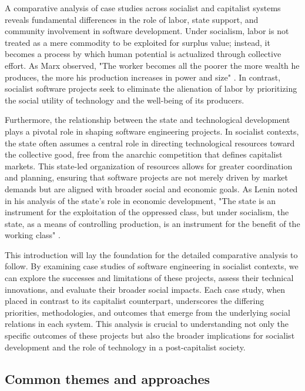 \begin{refsection}
A comparative analysis of case studies across socialist and capitalist systems reveals fundamental differences in the role of labor, state support, and community involvement in software development. Under socialism, labor is not treated as a mere commodity to be exploited for surplus value; instead, it becomes a process by which human potential is actualized through collective effort. As Marx observed, "The worker becomes all the poorer the more wealth he produces, the more his production increases in power and size" \cite[pp.~123]{marx1844}. In contrast, socialist software projects seek to eliminate the alienation of labor by prioritizing the social utility of technology and the well-being of its producers.

Furthermore, the relationship between the state and technological development plays a pivotal role in shaping software engineering projects. In socialist contexts, the state often assumes a central role in directing technological resources toward the collective good, free from the anarchic competition that defines capitalist markets. This state-led organization of resources allows for greater coordination and planning, ensuring that software projects are not merely driven by market demands but are aligned with broader social and economic goals. As Lenin noted in his analysis of the state’s role in economic development, "The state is an instrument for the exploitation of the oppressed class, but under socialism, the state, as a means of controlling production, is an instrument for the benefit of the working class" \cite[pp.~35]{lenin1917}.

This introduction will lay the foundation for the detailed comparative analysis to follow. By examining case studies of software engineering in socialist contexts, we can explore the successes and limitations of these projects, assess their technical innovations, and evaluate their broader social impacts. Each case study, when placed in contrast to its capitalist counterpart, underscores the differing priorities, methodologies, and outcomes that emerge from the underlying social relations in each system. This analysis is crucial to understanding not only the specific outcomes of these projects but also the broader implications for socialist development and the role of technology in a post-capitalist society.

\subsection{Common themes and approaches}


\end{refsection}

